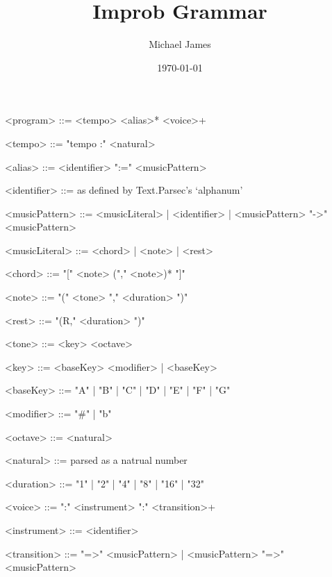 \documentclass{article}
\title{ Improb Grammar}
\author{Michael James}
\date{\today}
\begin{document}
\maketitle
\thispagestyle{empty}

\begin{grammar}
<program> ::= <tempo> <alias>* <voice>+

<tempo> ::= "tempo :" <natural>

<alias> ::= <identifier> ":=" <musicPattern>

<identifier> ::= as defined by Text.Parsec's `alphanum'

<musicPattern> ::= <musicLiteral> | <identifier> | <musicPattern> "->" <musicPattern>

<musicLiteral> ::= <chord> | <note> | <rest>

<chord> ::= "[" <note> ("," <note>)* "]"

<note> ::= "(" <tone> "," <duration> ")"

<rest> ::= "(R," <duration> ")" 

<tone> ::= <key> <octave>

<key> ::= <baseKey> <modifier> | <baseKey>

<baseKey> ::=  "A" | "B" | "C" | "D" | "E" | "F" | "G"

<modifier> ::= "#" | "b"

<octave> ::= <natural>

<natural> ::= parsed as a natrual number

<duration> ::= "1" | "2" | "4" | "8" | "16" | "32"

<voice> ::= ":" <instrument> ":" <transition>+

<instrument> ::= <identifier>

<transition> ::= "=>" <musicPattern> | <musicPattern> "=>" <musicPattern>

\end{grammar}
\end{document}
